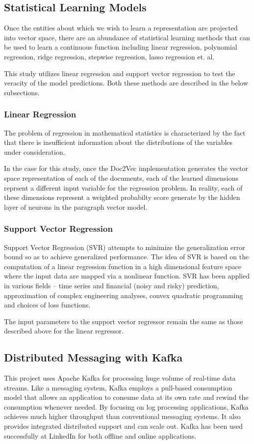 \documentclass[conference]{IEEEtran}
\begin{document}
    \subsection{Statistical Learning Models}
    Once the entities about which we wish to learn a representation are projected into vector space, there are an abundance of statistical learning methods that can be used to learn a continuous function including linear regression, polynomial regression, ridge regression, stepwise regression, lasso regression et. al.

    This study utilizes linear regression and support vector regression to test the veracity of the model predictions. Both these methods are described in the below subsections.

    \subsubsection{Linear Regression}
    The problem of regression in mathematical statistics is characterized by the fact that there is insufficient information about the distributions of the variables under consideration\cite{regression_analysis}.

    In the case for this study, once the Doc2Vec implementation generates the vector space representation of each of the documents, each of the learned dimensions reprsent a different input variable for the regression problem. In reality, each of these dimensions represent a weighted probabilty score generate by the hidden layer of neurons in the paragraph vector model.

    \subsubsection{Support Vector Regression}
    Support Vector Regression (SVR) attempts to minimize the generalization error bound so as to achieve generalized performance. The idea of SVR is based on the computation of a linear regression function in a high dimensional feature space where the input data are mapped via a nonlinear function. SVR has been applied in various fields – time series and financial (noisy and risky) prediction, approximation of complex engineering analyses, convex quadratic programming and choices of loss functions\cite{basak2007support}.

    The input parameters to the support vector regressor remain the same as those described above for the linear regressor.


    \subsection{Distributed Messaging with Kafka}
    This project uses Apache Kafka for processing huge volume of real-time data streams. Like a messaging system, Kafka employs a pull-based consumption model that allows an application to consume data at its own rate and rewind the consumption whenever needed. By focusing on log processing applications, Kafka achieves much higher throughput than conventional messaging systems. It also provides integrated distributed support and can scale out. Kafka has been used successfully at LinkedIn for both offline and online applications. \cite{kreps2011kafka}
\end{document}
